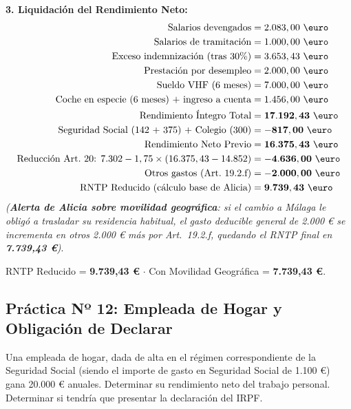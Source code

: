 \documentclass[11pt,a4paper,openany]{article}
\begin{document}
\begin{solucionBox}
\textbf{3. Liquidación del Rendimiento Neto:}
\begin{align*}
    \text{Salarios devengados} &= 2.083,00\text{ \euro} \\
    \text{Salarios de tramitación} &= 1.000,00\text{ \euro} \\
    \text{Exceso indemnización (tras 30\%)} &= 3.653,43\text{ \euro} \\
    \text{Prestación por desempleo} &= 2.000,00\text{ \euro} \\
    \text{Sueldo VHF (6 meses)} &= 7.000,00\text{ \euro} \\
    \text{Coche en especie (6 meses) + ingreso a cuenta} &= 1.456,00\text{ \euro} \\
    \mathbf{\text{Rendimiento Íntegro Total}} &= \mathbf{17.192,43\text{ \euro}} \\
    \text{Seguridad Social (142 + 375) + Colegio (300)} &= -\mathbf{817,00\text{ \euro}} \\
    \mathbf{\text{Rendimiento Neto Previo}} &= \mathbf{16.375,43\text{ \euro}} \\
    \text{Reducción Art.~20: } 7.302 - 1,75 \times (16.375,43 - 14.852) &= -\mathbf{4.636,00\text{ \euro}} \\
    \text{Otros gastos (Art.~19.2.f)} &= -\mathbf{2.000,00\text{ \euro}} \\
    \mathbf{\text{RNTP Reducido (cálculo base de Alicia)}} &= \mathbf{9.739,43\text{ \euro}}
\end{align*}
\textit{\small(\textbf{Alerta de Alicia sobre movilidad geográfica}: si el cambio a Málaga le obligó a trasladar su residencia habitual, el gasto deducible general de 2.000 € se incrementa en otros 2.000 € más por Art.~19.2.f, quedando el RNTP final en \textbf{7.739,43 \euro})}.
\end{solucionBox}

\begin{resultadoBox}
RNTP Reducido = \textbf{9.739,43 \euro} $\cdot$ Con Movilidad Geográfica = \textbf{7.739,43 \euro}.
\end{resultadoBox}

\vspace{0.4cm}

\subsection{Práctica Nº 12: Empleada de Hogar y Obligación de Declarar}

\begin{enunciadoBox}
Una empleada de hogar, dada de alta en el régimen correspondiente de la Seguridad Social (siendo el importe de gasto en Seguridad Social de 1.100 \euro{}) gana 20.000 \euro{} anuales. Determinar su rendimiento neto del trabajo personal. Determinar si tendría que presentar la declaración del IRPF.
\end{enunciadoBox}
\end{document}

